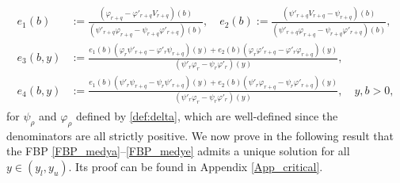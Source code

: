 \documentclass[11pt]{article} %
\renewcommand{\phi}{\varphi}
\numberwithin{komcounter}{section}
\numberwithin{equation}{section}
\numberwithin{theorem}{section}
\begin{document}
\begin{align} \label{constants_complex}
\begin{split}
e_1(b) 
&:=\frac{(\phi_{r+q}-\phi'_{r+q}V_{r+q})(b)}{(\psi'_{r+q}\phi_{r+q}-\psi_{r+q}\phi'_{r+q})(b)}, 
\quad 
e_2(b) 
:=\frac{(\psi'_{r+q}V_{r+q}-\psi_{r+q})(b)}{(\psi'_{r+q}\phi_{r+q}-\psi_{r+q}\phi'_{r+q})(b)}, \\ 
e_3(b,y) 
&:= \frac{e_1(b)(\phi_r\psi'_{r+q} - \phi'_r\psi_{r+q})(y) + e_2(b)(\phi_r\phi'_{r+q} - \phi'_r\phi_{r+q})(y)}{(\psi'_{r}\phi_{r}-\psi_{r}\phi'_{r})(y)}, \\ 
e_4(b,y) 
&:= \frac{e_1(b)(\psi'_r\psi_{r+q}-\psi_r\psi'_{r+q})(y) + e_2(b)(\psi'_r\phi_{r+q}-\psi_r\phi'_{r+q})(y)}{(\psi'_{r}\phi_{r}-\psi_{r}\phi'_{r})(y)}
, \quad y,b > 0,
\end{split}
\end{align}
for $\psi_\rho$ and $\phi_\rho$ defined by \eqref{def:delta}, which are well-defined since the denominators are all strictly positive.
We now prove in the following result that the FBP \eqref{FBP_medya}--\eqref{FBP_medye} admits a unique solution for all $y\in(y_l,y_u)$. Its proof can be found in Appendix \ref{App_critical}.
\end{document}
